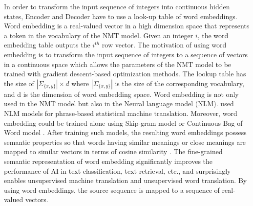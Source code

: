 In order to transform the input sequence of integers into continuous hidden states, Encoder and Decoder have to use a look-up table of word embeddings. Word embedding is a real-valued vector in a high dimension space that represents a token in the vocabulary of the NMT model. Given an integer $i$, the word embedding table outputs the $i^{th}$ row vector. The motivation of using word embedding is to transform the input sequence of integers to a sequence of vectors in a continuous space which allows the parameters of the NMT model to be trained with gradient descent-based optimization methods. The lookup table has the size of $|\Sigma_{\{x,y\}}| \times d$ where $|\Sigma_{\{x,y\}}|$ is the size of the corresponding vocabulary, and d is the dimension of word embedding space. Word embedding is not only used in the NMT model but also in the Neural language model \cite{Bengio03aneural}(NLM). \cite{Le12continuous, Schwenk12continuous} used NLM models for phrase-based statistical machine translation. Moreover, word embedding could be trained alone using Skip-gram model \citep{Mikolov13distributed} or Continuous Bag of Word model \cite{Mikolov13efficient}. After training such models, the resulting word embeddings possess semantic properties so that words having similar meanings or close meanings are mapped to similar vectors in terms of cosine similarity \citep{Collobert11natural, Mikolov13distributed, collobert08aunified}. The fine-grained semantic representation of word embedding significantly improves the performance of AI in text classification, text retrieval, etc., and surprisingly enables unsupervised machine translation and unsupervised word translation. By using word embeddings, the source sequence is mapped to a sequence of real-valued vectors. 

